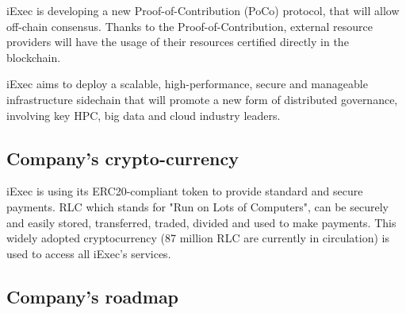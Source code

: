     iExec is developing a new Proof-of-Contribution\cite{POCO} (PoCo) protocol, that will allow off-chain
    consensus. Thanks to the Proof-of-Contribution, external resource providers will have the usage
    of their resources certified directly in the blockchain.

    iExec aims to deploy a scalable, high-performance, secure and manageable infrastructure sidechain
    that will promote a new form of distributed governance, involving key HPC, big data and cloud
    industry leaders.

  \subsection{Company's crypto-currency}
    iExec is using its ERC20-compliant token to provide standard and secure payments. RLC\cite{RLC} which stands for
    "Run on Lots of Computers", can be securely and easily stored, transferred, traded, divided and used
    to make payments. This widely adopted cryptocurrency (87 million RLC are currently in circulation)
    is used to access all iExec's services.

  \subsection{Company's roadmap}

